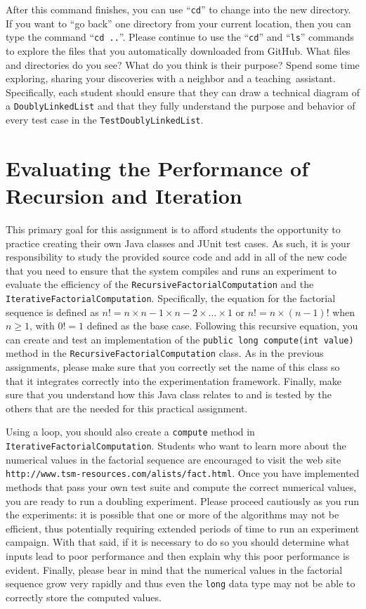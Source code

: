 \documentclass[11pt]{article}
\newcommand{\mainprogram}{\lstinline{DoublyLinkedList}}
\newcommand{\command}[1]{``\lstinline{#1}''}
\newcommand{\program}[1]{\lstinline{#1}}
\newcommand{\url}[1]{\lstinline{#1}}
\newcommand{\step}[1]{``{#1}''}
\begin{document}
After this command finishes, you can use \command{cd} to change into the new
directory. If you want to \step{go back} one directory from your current
location, then you can type the command \command{cd ..}. Please continue to use
the \command{cd} and \command{ls} commands to explore the files that you
automatically downloaded from GitHub. What files and directories do you see?
What do you think is their purpose? Spend some time exploring, sharing your
discoveries with a neighbor and a \mbox{teaching assistant}. Specifically, each
student should ensure that they can draw a technical diagram of a \mainprogram{}
and that they fully understand the purpose and behavior of every test case in
the \program{TestDoublyLinkedList}.

\section*{Evaluating the Performance of Recursion and Iteration}

This primary goal for this assignment is to afford students the opportunity to
practice creating their own Java classes and JUnit test cases. As such, it is
your responsibility to study the provided source code and add in all of the new
code that you need to ensure that the system compiles and runs an experiment to
evaluate the efficiency of the \program{RecursiveFactorialComputation} and the
\program{IterativeFactorialComputation}. Specifically, the equation for the
factorial sequence is defined as $n! = n \times n-1 \times n-2 \times \ldots
\times 1$ or $n! = n \times (n-1)!$ when $n \geq 1$, with $0! = 1$ defined as
the base case. Following this recursive equation, you can create and test an
implementation of the \program{public long compute(int value)} method in the
\program{RecursiveFactorialComputation} class. As in the previous assignments,
please make sure that you correctly set the name of this class so that it
integrates correctly into the experimentation framework. Finally, make sure that
you understand how this Java class relates to and is tested by the others that
are the needed for this practical assignment.

Using a loop, you should also create a \program{compute} method in
\program{IterativeFactorialComputation}. Students who want to learn more about
the numerical values in the factorial sequence are encouraged to visit the web
site \url{http://www.tsm-resources.com/alists/fact.html}. Once you have
implemented methods that pass your own test suite and compute the correct
numerical values, you are ready to run a doubling experiment. Please proceed
cautiously as you run the experiments: it is possible that one or more of the
algorithms may not be efficient, thus potentially requiring extended periods of
time to run an experiment campaign. With that said, if it is necessary to do so
you should determine what inputs lead to poor performance and then explain why
this poor performance is evident. Finally, please bear in mind that the
numerical values in the factorial sequence grow very rapidly and thus even the
\program{long} data type may not be able to correctly store the computed values.
\end{document}
